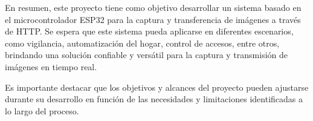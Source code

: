 En resumen, este proyecto tiene como objetivo desarrollar un sistema basado en el microcontrolador ESP32 para la captura y transferencia de imágenes a través de HTTP. Se espera que este sistema pueda aplicarse en diferentes escenarios, como vigilancia, automatización del hogar, control de accesos, entre otros, brindando una solución confiable y versátil para la captura y transmisión de imágenes en tiempo real.

Es importante destacar que los objetivos y alcances del proyecto pueden ajustarse durante su desarrollo en función de las necesidades y limitaciones identificadas a lo largo del proceso.
